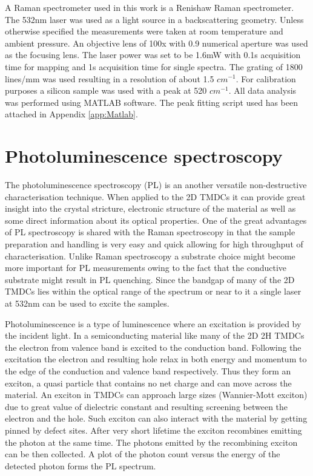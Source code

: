 A Raman spectrometer used in this work is a Renishaw Raman spectrometer. The 532nm laser was used as a light source in a backscattering geometry. Unless otherwise specified the measurements were taken at room temperature and ambient pressure. An objective lens of 100x with 0.9 numerical aperture was used as the focusing lens. The laser power was set to be 1.6mW with 0.1s acquisition time for mapping and 1s acquisition time for single spectra. The grating of 1800 lines/mm was used resulting in a resolution of about 1.5 $cm^{-1}$. For calibration purposes a silicon sample was used with a peak at 520 $cm^{-1}$. All data analysis was performed using MATLAB software. The peak fitting script used has been attached in Appendix \ref{app:Matlab}.

\section{Photoluminescence spectroscopy}

The photoluminescence spectroscopy (PL) is an another versatile non-destructive characterisation technique. When applied to the 2D TMDCs it can provide great insight into the crystal stricture, electronic structure of the material as well as some direct information about its optical properties. One of the great advantages of PL spectroscopy is shared with the Raman spectroscopy in that the sample preparation and handling is very easy and quick allowing for high throughput of characterisation. Unlike Raman spectroscopy a substrate choice might become more important for PL measurements owing to the fact that the conductive substrate might result in PL quenching. Since the bandgap of many of the 2D TMDCs lies within the optical range of the spectrum or near to it a single laser at 532nm can be used to excite the samples.

Photoluminescence is a type of luminescence where an excitation is provided by the incident light. In a semiconducting material like many of the 2D 2H TMDCs the electron from valence band is excited to the conduction band. Following the excitation the electron and resulting hole relax in both energy and momentum to the edge of the conduction and valence band respectively. Thus they form an exciton, a quasi particle that contains no net charge and can move across the material. An exciton in TMDCs can approach large sizes (Wannier-Mott exciton) due to great value of dielectric constant and resulting screening between the electron and the hole. Such exciton can also interact with the material by getting pinned by defect sites. After very short lifetime the exciton recombines emitting the photon at the same time. The photons emitted by the recombining exciton can be then collected. A plot of the photon count versus the energy of the detected photon forms the PL spectrum.

